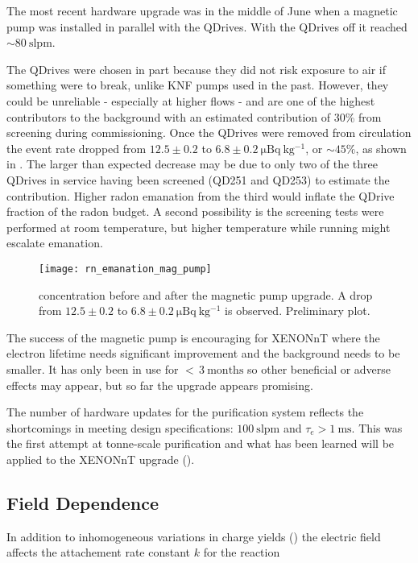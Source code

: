 The most recent hardware upgrade was in the middle of June when a magnetic pump  was installed in parallel with the
QDrives.  With the QDrives off it reached ${\sim} 80\ \mathrm{slpm}$.

The QDrives were chosen in part because they did not risk exposure to air if something were to
break, unlike KNF pumps used in the past.  However, they could be unreliable - especially at higher flows - and
are one of the highest contributors to the 
background with an estimated contribution of 30\% from screening during commissioning.  Once the QDrives were removed from circulation the
 event rate dropped from $12.5 \pm 0.2$ to
$6.8 \pm 0.2\ \mathrm{\mu Bq\ kg^{-1}}$, or ${\sim} 45\%$, as shown in .  The larger
than expected decrease may be due to only two of the three QDrives in service having been screened (QD251 and QD253) to estimate the
contribution.  Higher radon emanation from the third would inflate
the QDrive fraction of the radon budget.  A second possibility is the screening tests were performed at room temperature, but higher
temperature while running might escalate emanation.

\begin{figure}
\centering
\texttt{[image: rn\_emanation\_mag\_pump]}
\caption{ concentration before and after the magnetic pump upgrade.  A drop from
$12.5 \pm 0.2$ to $6.8 \pm 0.2\ \mathrm{\mu Bq\ kg^{-1}}$ is observed.  Preliminary plot.}
\label{fig:electron_lifetime_model_ops_rn_emanation}
\end{figure}

The success of the magnetic pump is encouraging for XENONnT where the electron lifetime needs significant improvement and the background
needs to be smaller.  It has only been in use for ${<}\, 3\ \mathrm{months}$ so other beneficial or adverse effects may appear, but so
far the upgrade appears promising.

The number of hardware updates for the purification system reflects the shortcomings in meeting design specifications:
$100\ \mathrm{slpm}$ and $\tau_e > 1\ \mathrm{ms}$.  This was the first attempt at tonne-scale purification and what has been learned will
be applied to the XENONnT upgrade ().



\subsection{Field Dependence}
\label{subsec:electron_lifetime_model_field}
In addition to inhomogeneous variations in charge yields () the electric field affects
the attachement rate constant $k$ for the reaction

